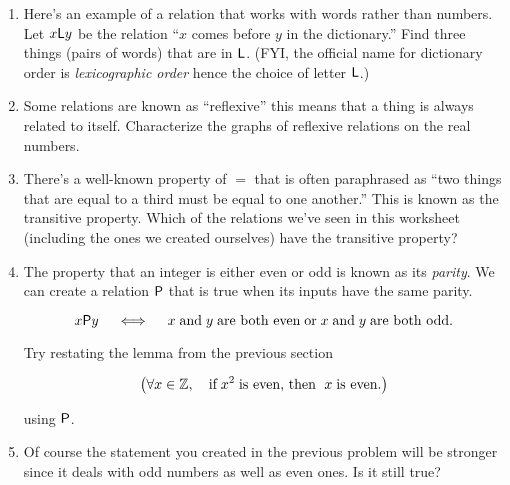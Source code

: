 \documentclass{amsart}
\begin{document}
\begin{enumerate}
\vfill

\item Here's an example of a relation that works with words rather than numbers.  Let  
$x\mbox{\textsf L}y$ be the relation ``$x$ comes before $y$ in the dictionary.''  Find three things (pairs of words) that are in $\mbox{\textsf L}$.  (FYI, the official name for dictionary order is {\em lexicographic order} hence the choice of letter $\mbox{\textsf L}$.)

\vfill

\newpage

\item Some relations are known as ``reflexive'' this means that a thing is always related to itself.  Characterize the graphs of reflexive relations on the real numbers.

\vfill

\item There's a well-known property of $=$ that is often paraphrased as ``two things that are equal to a third must be equal to one another.''  This is known as the transitive property. Which of the relations we've seen in this worksheet (including the ones we created ourselves) have the transitive property?

\vfill

\item The property that an integer is either even or odd is known as its {\em parity}.  We can create a relation $\mbox{\textsf P}$ that is true when its inputs have the same parity.

\[ x \mbox{\textsf P} y \quad \iff \quad x \; \mbox{and} \; y \; \mbox{are both even} \; \mbox{or} \; x \; \mbox{and} \; y \; \mbox{are both odd}. \] 

Try restating the lemma from the previous section 

\[  \left( \forall x \in {\mathbb Z}, \quad \mbox{if} \; x^2 \; \mbox{is even, then } \; x \; \mbox{is even}. \right) \]

\noindent using $\mbox{\textsf P}$.  

\vfill

\item Of course the statement you created in the previous problem will be stronger since it deals with odd numbers as well as even ones.  Is it still true?

\vfill

\end{enumerate}
\end{document}
